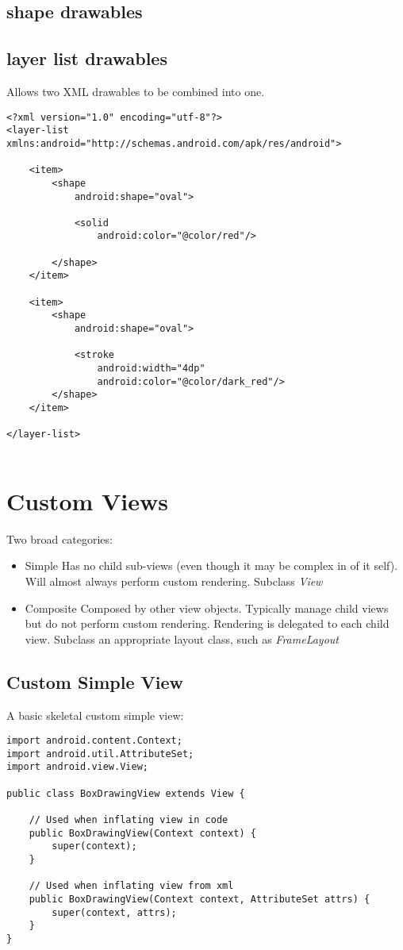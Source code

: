 \documentclass[]{article}
\renewcommand{\it}[1]{\textit{#1}}
\begin{document}
\subsection{shape drawables}

\subsection{layer list drawables}
Allows two XML drawables to be combined into one.
\begin{lstlisting}
<?xml version="1.0" encoding="utf-8"?>
<layer-list xmlns:android="http://schemas.android.com/apk/res/android">

	<item>
		<shape
			android:shape="oval">

			<solid
				android:color="@color/red"/>

		</shape>
	</item>

	<item>
		<shape
			android:shape="oval">

			<stroke
				android:width="4dp"
				android:color="@color/dark_red"/>
		</shape>
	</item>

</layer-list>


\end{lstlisting}

\section{Custom Views}
Two broad categories:
\begin{itemize}
	\item Simple
	\subitem Has no child sub-views (even though it may be complex in of it self).
	\subitem Will almost always perform custom rendering.
	\subitem Subclass \it{View}
	 
	\item Composite
	\subitem Composed by other view objects.
	\subitem Typically manage child views but do not perform custom rendering.
	\subitem Rendering is delegated to each child view.
	\subitem Subclass an appropriate layout class, such as \it{FrameLayout}
\end{itemize}

\subsection{Custom Simple View}
A basic skeletal custom simple view:
\begin{lstlisting}
import android.content.Context;
import android.util.AttributeSet;
import android.view.View;

public class BoxDrawingView extends View {
	
	// Used when inflating view in code
	public BoxDrawingView(Context context) {
		super(context);
	}
	
	// Used when inflating view from xml
	public BoxDrawingView(Context context, AttributeSet attrs) {
		super(context, attrs);
	}
}
\end{lstlisting}
\end{document}
